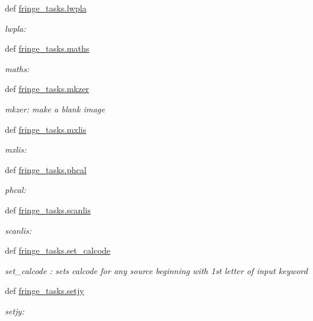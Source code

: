 \begin{DoxyCompactItemize}
def \hyperlink{namespacefringe__tasks_a00a04a720cc72555f0ae059f25779ec9}{fringe\-\_\-tasks.\-lwpla}
\begin{DoxyCompactList}\small\item\em lwpla\-: \end{DoxyCompactList}\item 
def \hyperlink{namespacefringe__tasks_a88f86d87604658175fbe3a0903b13346}{fringe\-\_\-tasks.\-maths}
\begin{DoxyCompactList}\small\item\em maths\-: \end{DoxyCompactList}\item 
def \hyperlink{namespacefringe__tasks_a241ef1647082cf05edd1c686424ff701}{fringe\-\_\-tasks.\-mkzer}
\begin{DoxyCompactList}\small\item\em mkzer\-: make a blank image \end{DoxyCompactList}\item 
def \hyperlink{namespacefringe__tasks_a8b29e6f20d9c502b92a2a96a28868a2c}{fringe\-\_\-tasks.\-mxlis}
\begin{DoxyCompactList}\small\item\em mxlis\-: \end{DoxyCompactList}\item 
def \hyperlink{namespacefringe__tasks_a883137dd7fd6f1388a43e1c7d42266dc}{fringe\-\_\-tasks.\-phcal}
\begin{DoxyCompactList}\small\item\em phcal\-: \end{DoxyCompactList}\item 
def \hyperlink{namespacefringe__tasks_ac3886042926f08aaf94ef29822079f9d}{fringe\-\_\-tasks.\-scanlis}
\begin{DoxyCompactList}\small\item\em scanlis\-: \end{DoxyCompactList}\item 
def \hyperlink{namespacefringe__tasks_abaec81cfee62be800b35533d624fde36}{fringe\-\_\-tasks.\-set\-\_\-calcode}
\begin{DoxyCompactList}\small\item\em set\-\_\-calcode \-: sets calcode for any source beginning with 1st letter of input keyword \end{DoxyCompactList}\item 
def \hyperlink{namespacefringe__tasks_a053360026d85a0d5cffb17e208c29300}{fringe\-\_\-tasks.\-setjy}
\begin{DoxyCompactList}\small\item\em setjy\-: \end{DoxyCompactList}\item 

\end{DoxyCompactItemize}
